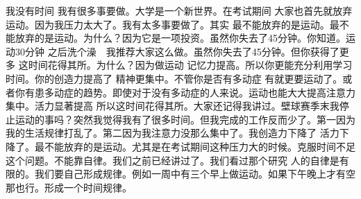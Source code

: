 我没有时间 我有很多事要做。大学是一个新世界。在考试期间 大家也首先就放弃运动。因为我压力太大了。我有太多事要做了。其实 最不能放弃的是运动。最不能放弃的是运动。为什么？因为它是一项投资。虽然你失去了45分钟。你知道。运动30分钟 之后洗个澡　我推荐大家这么做。虽然你失去了45分钟。但你获得了更多 这时间花得其所。为什么？因为做运动 记忆力提高。所以你更能充分利用学习时间。你的创造力提高了 精神更集中。不管你是否有多动症 有就更要运动了。或者你有患多动症的趋势。即使对于没有多动症的人来说。运动也能大大提高注意力集中。活力显著提高 所以这时间花得其所。大家还记得我讲过。壁球赛季末我停止运动的事吗？突然我觉得我有了很多时间。但我完成的工作反而少了。第一因为我的生活规律打乱了。第二因为我注意力没那么集中了。我创造力下降了 活力下降了。最不能放弃的是运动。尤其是在考试期间这种压力大的时候。克服时间不足这个问题。不能靠自律。我们之前已经讲过了。我们看过那个研究 人的自律是有限的。我们要自己形成规律。例如一周中有三个早上做运动。如果下午晚上才有空 那也行。形成一个时间规律。 

